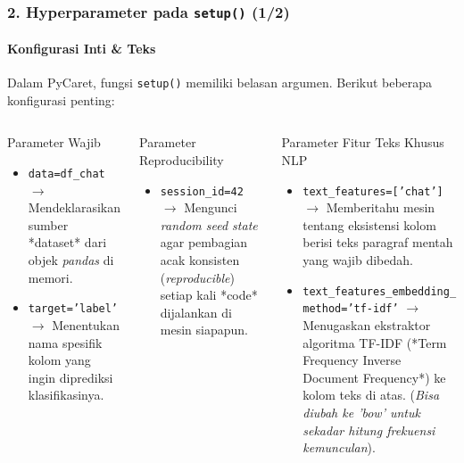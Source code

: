\documentclass[t,aspectratio=169,xcolor=dvipsnames]{beamer}
\begin{document}
\begin{frame}
    \frametitle{2. Hyperparameter pada \texttt{setup()} (1/2)}
    \framesubtitle{Konfigurasi Inti \& Teks}
    \scriptsize
    Dalam PyCaret, fungsi \texttt{setup()} memiliki belasan argumen. Berikut beberapa konfigurasi penting:
    \vspace{0.2cm}
    \begin{columns}[T]
        \begin{block}{Parameter Wajib}
            \begin{itemize}
                \item \texttt{data=df\_chat} $\rightarrow$ Mendeklarasikan sumber *dataset* dari objek \textit{pandas} di memori.
                \item \texttt{target='label'} $\rightarrow$ Menentukan nama spesifik kolom yang ingin diprediksi klasifikasinya.
            \end{itemize}
        \end{block}
        \begin{block}{Parameter Reproducibility}
            \begin{itemize}
                \item \texttt{session\_id=42} $\rightarrow$ Mengunci \textit{random seed state} agar pembagian acak konsisten (\textit{reproducible}) setiap kali *code* dijalankan di mesin siapapun.
            \end{itemize}
        \end{block}

        \begin{block}{Parameter Fitur Teks Khusus NLP}
            \begin{itemize}
                \item \texttt{text\_features=['chat']} $\rightarrow$ Memberitahu mesin tentang eksistensi kolom berisi teks paragraf mentah yang wajib dibedah.
                \item \texttt{text\_features\_embedding\_\\method='tf-idf'} $\rightarrow$ Menugaskan ekstraktor algoritma TF-IDF (*Term Frequency Inverse Document Frequency*) ke kolom teks di atas. (\textit{Bisa diubah ke 'bow' untuk sekadar hitung frekuensi kemunculan}).
            \end{itemize}
        \end{block}
    \end{columns}
\end{frame}
\end{document}
